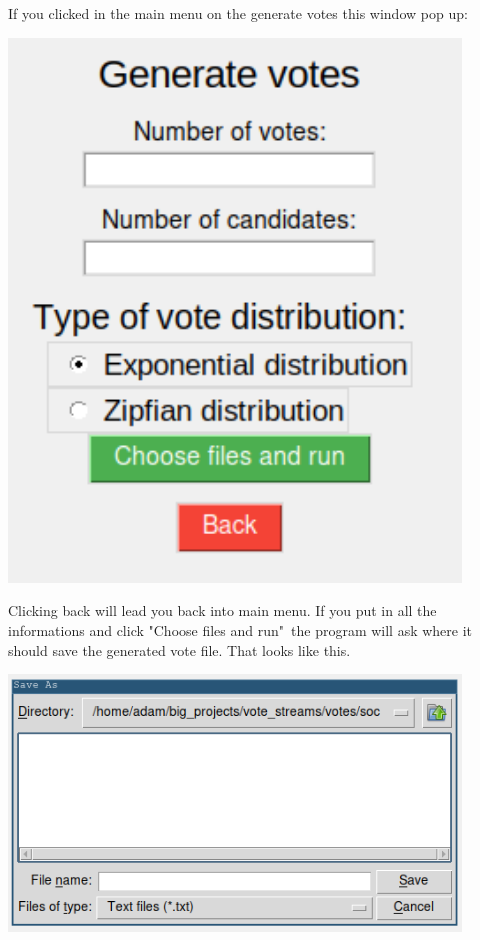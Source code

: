\documentclass[a4paper,12pt]{report}
\begin{document}
	If you clicked in the main menu on the generate votes this window pop up:
	
	\begin{center}
		\includegraphics[width=12cm]{generate_votes.png}
	\end{center}
	
	Clicking back will lead you back into main menu. If you put in all the informations and click "Choose files and run"\ the program will ask where it should save the generated vote file. That looks like this.
	
	\begin{center}
		\includegraphics[width=12cm]{save_as.png}
	\end{center}
	
\end{document}
